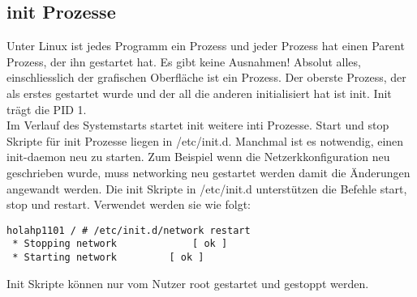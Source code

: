 \subsection{init Prozesse}
Unter Linux ist jedes Programm ein Prozess und jeder Prozess hat einen Parent Prozess, der ihn gestartet hat. Es gibt keine Ausnahmen! Absolut alles, einschliesslich der grafischen Oberfl\"ache ist ein Prozess. Der oberste Prozess, der als erstes gestartet wurde und der all die anderen initialisiert hat ist init. Init tr\"agt die PID 1.\\
Im Verlauf des Systemstarts startet init weitere inti Prozesse. Start und stop Skripte f\"ur init Prozesse liegen in /etc/init.d. Manchmal ist es notwendig, einen init-daemon neu zu starten. Zum Beispiel wenn die Netzerkkonfiguration neu geschrieben wurde, muss networking neu gestartet werden damit die \"Anderungen angewandt werden. Die init Skripte in /etc/init.d unterst\"utzen die Befehle start, stop und restart. Verwendet werden sie wie folgt:
\begin{lstlisting}[frame=single]
holahp1101 / # /etc/init.d/network restart
 * Stopping network             [ ok ]
 * Starting network 	   	[ ok ]
\end{lstlisting}
Init Skripte k\"onnen nur vom Nutzer root gestartet und gestoppt werden.
